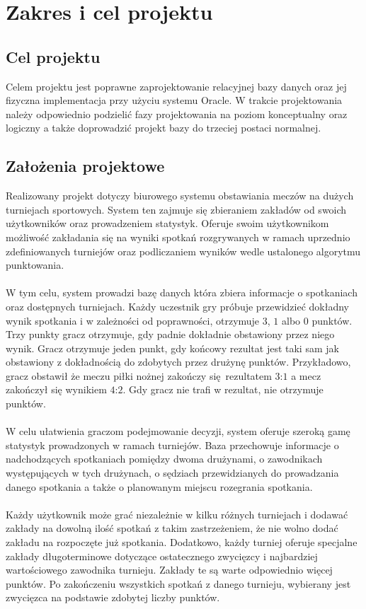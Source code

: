 \documentclass{mwrep}
\begin{document}
\chapter{Zakres i cel projektu}

\section{Cel projektu}
Celem projektu jest poprawne zaprojektowanie relacyjnej bazy danych oraz jej
fizyczna implementacja przy użyciu systemu Oracle. W trakcie projektowania należy
odpowiednio podzielić fazy projektowania na poziom konceptualny oraz logiczny a także 
doprowadzić projekt bazy do trzeciej postaci normalnej.

\section{Założenia projektowe}
Realizowany projekt dotyczy biurowego systemu obstawiania meczów
na dużych turniejach sportowych. System ten zajmuje się zbieraniem 
zakładów od swoich użytkowników oraz prowadzeniem statystyk. 
Oferuje swoim użytkownikom możliwość zakładania się na wyniki spotkań
rozgrywanych w ramach uprzednio zdefiniowanych turniejów oraz podliczaniem 
wyników wedle ustalonego algorytmu punktowania.
\\ 
\\
\indent W tym celu, system prowadzi bazę danych która zbiera informacje o spotkaniach
oraz dostępnych turniejach. Każdy uczestnik gry próbuje przewidzieć dokładny wynik 
spotkania i w zależności od poprawności, otrzymuje $3$, $1$ albo $0$ punktów.
Trzy punkty gracz otrzymuje, gdy padnie dokładnie obstawiony przez niego wynik.
Gracz otrzymuje jeden punkt, gdy końcowy rezultat jest taki sam jak obstawiony z dokładnością
do zdobytych przez drużynę punktów. Przykładowo, gracz obstawił że meczu piłki
nożnej zakończy się rezultatem $3$:$1$ a mecz zakończył się wynikiem $4$:$2$. 
Gdy gracz nie trafi w rezultat, nie otrzymuje punktów.  
\\
\\
\indent W celu ułatwienia graczom podejmowanie decyzji, system oferuje szeroką gamę statystyk 
prowadzonych w ramach turniejów. Baza przechowuje informacje o nadchodzących spotkaniach 
pomiędzy dwoma drużynami, o zawodnikach występujących w tych drużynach, o sędziach 
przewidzianych do prowadzania danego spotkania a także o planowanym miejscu rozegrania spotkania.  
\\
\\
\indent Każdy użytkownik może grać niezależnie w kilku różnych turniejach i dodawać zakłady 
na dowolną ilość spotkań z takim zastrzeżeniem, że nie wolno dodać zakładu na 
rozpoczęte już spotkania. Dodatkowo, każdy turniej oferuje specjalne zakłady długoterminowe
dotyczące ostatecznego zwycięzcy i najbardziej wartościowego zawodnika turnieju. Zakłady 
te są warte odpowiednio więcej punktów. Po zakończeniu wszystkich spotkań z danego turnieju, wybierany 
jest zwycięzca na podstawie zdobytej liczby punktów. 
\end{document}
